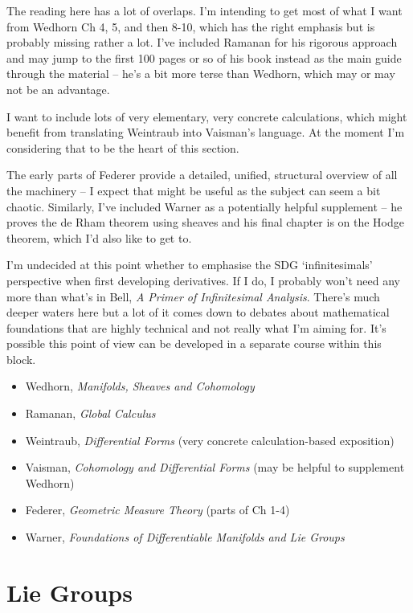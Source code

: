 \documentclass[article]{article}
\begin{document}
The reading here has a lot of overlaps. I'm intending to get most of what I want from Wedhorn Ch 4, 5, and then 8-10, which has the right emphasis but is probably missing rather a lot. I've included Ramanan for his rigorous approach and may jump to the first 100 pages or so of his book instead as the main guide through the material -- he's a bit more terse than Wedhorn, which may or may not be an advantage.

I want to include lots of very elementary, very concrete calculations, which might benefit from translating Weintraub into Vaisman's language. At the moment I'm considering that to be the heart of this section.

The early parts of Federer provide a detailed, unified, structural overview of all the machinery -- I expect that might be useful as the subject can seem a bit chaotic. Similarly, I've included Warner as a potentially helpful supplement -- he proves the de Rham theorem using sheaves and his final chapter is on the Hodge theorem, which I'd also like to get to.

I'm undecided at this point whether to emphasise the SDG `infinitesimals' perspective when first developing derivatives. If I do, I probably won't need any more than what's in Bell, \textit{A Primer of Infinitesimal Analysis}. There's much deeper waters here but a lot of it comes down to debates about mathematical foundations that are highly technical and not really what I'm aiming for. It's possible this point of view can be developed in a separate course within this block.

\begin{itemize}
	\item[]{Wedhorn, \textit{Manifolds, Sheaves and Cohomology}}
	\item[]{Ramanan, \textit{Global Calculus}}
	\item[]{Weintraub, \textit{Differential Forms} (very concrete calculation-based exposition)}
	\item[]{Vaisman, \textit{Cohomology and Differential Forms} (may be helpful to supplement Wedhorn)}
	\item[]{Federer, \textit{Geometric Measure Theory} (parts of Ch 1-4)}
	\item[]{Warner, \textit{Foundations of Differentiable Manifolds and Lie Groups}}
\end{itemize}

\section{Lie Groups}
\end{document}
